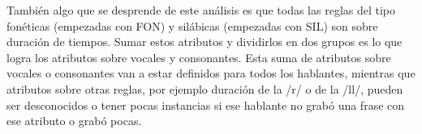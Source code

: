 También algo que se desprende de este análisis es que todas las reglas del tipo fonéticas (empezadas con FON) y silábicas (empezadas con SIL) son sobre duración de tiempos. Sumar estos atributos y dividirlos en dos grupos es lo que logra los atributos sobre vocales y consonantes. Esta suma de atributos sobre vocales o consonantes van a estar definidos para todos los hablantes, mientras que atributos sobre otras reglas, por ejemplo duración de la /r/ o de la /ll/, pueden ser desconocidos o tener pocas instancias si ese hablante no grabó una frase con ese atributo o grabó pocas. 



